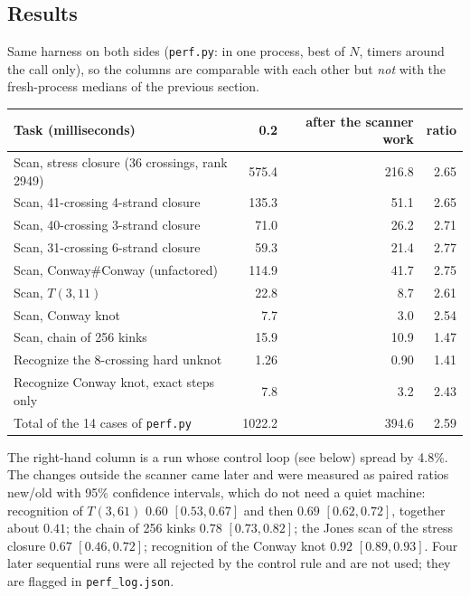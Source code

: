 \subsection{Results}
Same harness on both sides (\texttt{perf.py}: in one process, best of $N$,
timers around the call only), so the columns are comparable with each other
but \emph{not} with the fresh-process medians of the previous section.
\begin{center}\small
\begin{tabular}{@{}lrrr@{}}
\toprule
Task (milliseconds) & 0.2 & after the scanner work & ratio \\
\midrule
Scan, stress closure (36 crossings, rank 2949) & 575.4 & 216.8 & 2.65 \\
Scan, 41-crossing 4-strand closure & 135.3 & 51.1 & 2.65 \\
Scan, 40-crossing 3-strand closure & 71.0 & 26.2 & 2.71 \\
Scan, 31-crossing 6-strand closure & 59.3 & 21.4 & 2.77 \\
Scan, Conway\#Conway (unfactored) & 114.9 & 41.7 & 2.75 \\
Scan, $T(3,11)$ & 22.8 & 8.7 & 2.61 \\
Scan, Conway knot & 7.7 & 3.0 & 2.54 \\
Scan, chain of 256 kinks & 15.9 & 10.9 & 1.47 \\
Recognize the 8-crossing hard unknot & 1.26 & 0.90 & 1.41 \\
Recognize Conway knot, exact steps only & 7.8 & 3.2 & 2.43 \\
\midrule
Total of the 14 cases of \texttt{perf.py} & 1022.2 & 394.6 & 2.59 \\
\bottomrule
\end{tabular}
\end{center}
The right-hand column is a run whose control loop (see below) spread by 4.8\%.
The changes outside the scanner came later and were measured as paired ratios
new/old with 95\% confidence intervals, which do not need a quiet machine:
recognition of $T(3,61)$ $0.60$ $[0.53, 0.67]$ and then $0.69$ $[0.62, 0.72]$,
together about $0.41$; the chain of 256 kinks $0.78$ $[0.73, 0.82]$; the Jones
scan of the stress closure $0.67$ $[0.46, 0.72]$; recognition of the Conway
knot $0.92$ $[0.89, 0.93]$. Four later sequential runs were all rejected by the
control rule and are not used; they are flagged in \texttt{perf\_log.json}.

